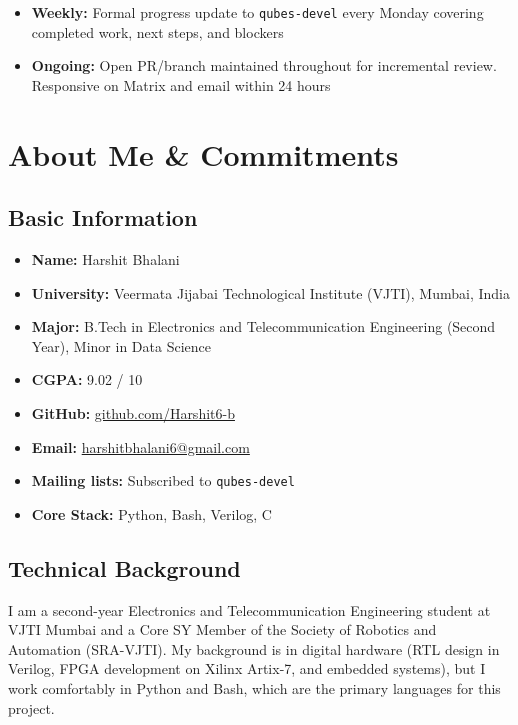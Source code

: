 \documentclass[12pt, a4paper]{article}
\begin{document}
\begin{itemize}
    \item \textbf{Weekly:} Formal progress update to \texttt{qubes-devel} every Monday covering completed work, next steps, and blockers
    \item \textbf{Ongoing:} Open PR/branch maintained throughout for incremental review. Responsive on Matrix and email within 24 hours
\end{itemize}

\section{About Me \& Commitments}

\subsection*{Basic Information}

\begin{itemize}
    \item \textbf{Name:} Harshit Bhalani
    \item \textbf{University:} Veermata Jijabai Technological Institute (VJTI), Mumbai, India
    \item \textbf{Major:} B.Tech in Electronics and Telecommunication Engineering (Second Year), Minor in Data Science
    \item \textbf{CGPA:} 9.02 / 10
    \item \textbf{GitHub:} \href{https://github.com/Harshit6-b}{github.com/Harshit6-b}
    \item \textbf{Email:} \href{mailto:harshitbhalani6@gmail.com}{harshitbhalani6@gmail.com}
    \item \textbf{Mailing lists:} Subscribed to \texttt{qubes-devel}
    \item \textbf{Core Stack:} Python, Bash, Verilog, C
\end{itemize}

\subsection*{Technical Background}

I am a second-year Electronics and Telecommunication Engineering student at VJTI Mumbai and a Core SY Member of the Society of Robotics and Automation (SRA-VJTI). My background is in digital hardware (RTL design in Verilog, FPGA development on Xilinx Artix-7, and embedded systems), but I work comfortably in Python and Bash, which are the primary languages for this project.
\end{document}

